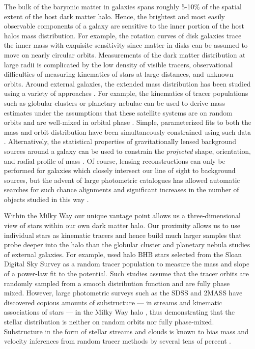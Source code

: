 The bulk of the baryonic matter in galaxies spans roughly 5-10\% of the spatial extent of the host dark matter halo. Hence, the brightest and most easily observable components of a galaxy are sensitive to the inner portion of the host halos mass distribution. For example, the rotation curves of disk galaxies trace the inner mass with exquisite sensitivity since matter in disks can be assumed to move on nearly circular orbits. Measurements of the dark matter distribution at large radii is complicated by the low density of visible tracers, observational difficulties of measuring kinematics of stars at large distances, and unknown orbits. Around external galaxies, the extended mass distribution has been studied using a variety of approaches \citep[see][for a complete and detailed review]{courteau13}. For example, the kinematics of tracer populations such as globular clusters or planetary nebulae can be used to derive mass estimates under the assumptions that these satellite systems are on random orbits and are well-mixed in orbital phase \citep[early investigations include][]{mendez01,cote03}. Simple, parameterized fits to both the mass and orbit distribution have been simultaneously constrained using such data \citep[e.g.][]{napolitano11,deason12c}. Alternatively, the statistical properties of gravitationally lensed background sources around a galaxy can be used to constrain the \emph{projected} shape, orientation, and radial profile of mass \citep[see, for example, the Lens Structure and Dynamics Survey described in][]{koopmans02}. Of course, lensing reconstructions can only be performed for galaxies which closely intersect our line of sight to background sources, but the advent of large photometric catalogues has allowed automatic searches for such chance alignments and significant increases in the number of objects studied in this way \citep[e.g. the Sloan Lens ACS Survey, see][]{bolton06}.

Within the Milky Way our unique vantage point allows us a three-dimensional view of stars within our own dark matter halo. Our proximity allows us to use individual stars as kinematic tracers and hence build much larger samples that probe deeper into the halo than the globular cluster and planetary nebula studies of external galaxies. For example, \cite{deason12a} used halo BHB stars selected from the Sloan Digital Sky Survey \cite[SDSS;][]{york00} as a random tracer population to measure the mass and slope of a power-law fit to the potential. Such studies assume that the tracer orbits are randomly sampled from a smooth distribution function and are fully phase mixed. However, large photometric surveys such as the SDSS and 2MASS \citep{skrutskie06} have discovered copious amounts of substructure --- in streams and kinematic associations of stars --- in the Milky Way halo \citep[e.g.,][]{belokurov06, rochapinto04}, thus demonstrating that the stellar distribution is neither on random orbits nor fully phase-mixed. Substructure in the form of stellar streams and clouds is known to bias mass and velocity inferences from random tracer methods by several tens of percent \citep{yencho06}.


